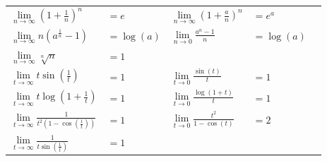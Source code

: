 \documentclass[a4paper, fontsize = 8pt, landscape]{scrartcl}
\begin{document}
\begin{multicols*}{3}
    \begin{center}
        \renewcommand{\arraystretch}{2}
        \begin{tabular}{l l l l l} \toprule
            $\lim\limits_{n \to \infty} (1 + \frac{1}{n})^n$                  & \hspace*{-10pt} $= e$      & \hspace*{+10pt}
            $\lim\limits_{n \to \infty} (1 + \frac{a}{n})^n$                  & \hspace*{-10pt}$= e^a$                       \\
            $\lim\limits_{n \to \infty} n ( a^{\frac{1}{n}} - 1)$             & \hspace*{-10pt}$= \log(a)$ & \hspace*{+10pt}
            $\lim\limits_{n \to 0} \frac{a^n - 1}{n}$                         & \hspace*{-10pt}$= \log(a)$                   \\
            $\lim\limits_{n \to \infty} \sqrt[n]{n}$                          & \hspace*{-10pt}$= 1$       & \hspace*{+10pt} \\
            \midrule
            $\lim\limits_{t \to \infty} t \sin(\frac{1}{t})$                  & \hspace*{-10pt}$= 1$       & \hspace*{+10pt}
            $\lim\limits_{t \to 0} \frac{\sin(t)}{t}$                         & \hspace*{-10pt}$= 1$                         \\
            $\lim\limits_{t \to \infty} t \log(1 + \frac{1}{t})$              & \hspace*{-10pt}$= 1$       & \hspace*{+10pt}
            $\lim\limits_{t \to 0} \frac{\log(1 + t)}{t}$                     & \hspace*{-10pt}$= 1$                         \\
            $\lim\limits_{t \to \infty} \frac{1}{t^2(1 - \cos(\frac{1}{t}))}$ & \hspace*{-10pt}$= 1$       & \hspace*{+10pt}
            $\lim\limits_{t \to 0} \frac{t^2}{1 - \cos(t)}$                   & \hspace*{-10pt}$= 2$                         \\
            $\lim\limits_{t \to \infty} \frac{1}{t \sin(\frac{1}{t})}$        & \hspace*{-10pt}$= 1$       & \hspace*{+10pt}

\end{tabular}
\end{center}
\end{multicols*}
\end{document}
